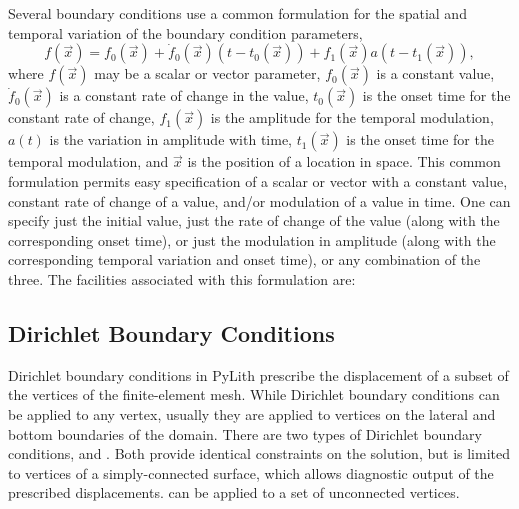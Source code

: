 Several boundary conditions use a common formulation for the spatial
and temporal variation of the boundary condition parameters,
\begin{equation}
f(\vec{x})=f_{0}(\vec{x})+\dot{f}_{0}(\vec{x})(t-t_{0}(\vec{x}))+f_{1}(\vec{x})a(t-t_{1}(\vec{x})),
\end{equation}
where $f(\vec{x})$ may be a scalar or vector parameter, $f_{0}(\vec{x})$
is a constant value, $\dot{f}_{0}(\vec{x})$ is a constant rate of
change in the value, $t_{0}(\vec{x})$ is the onset time for the constant
rate of change, $f_{1}(\vec{x})$ is the amplitude for the temporal
modulation, $a(t)$ is the variation in amplitude with time, $t_{1}(\vec{x})$
is the onset time for the temporal modulation, and $\vec{x}$ is the
position of a location in space. This common formulation permits easy
specification of a scalar or vector with a constant value, constant
rate of change of a value, and/or modulation of a value in time. One
can specify just the initial value, just the rate of change of the
value (along with the corresponding onset time), or just the modulation
in amplitude (along with the corresponding temporal variation and
onset time), or any combination of the three. The facilities associated
with this formulation are:
\begin{inventory}
\end{inventory}

\subsection{Dirichlet Boundary Conditions}

Dirichlet boundary conditions in PyLith prescribe the displacement
of a subset of the vertices of the finite-element mesh. While Dirichlet
boundary conditions can be applied to any vertex, usually they are
applied to vertices on the lateral and bottom boundaries of the domain.
There are two types of Dirichlet boundary conditions, 
and . Both provide identical constraints on the solution,
but  is limited to vertices of a simply-connected
surface, which allows diagnostic output of the prescribed displacements.
 can be applied to a set of unconnected vertices.

